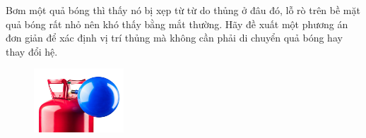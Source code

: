  Bơm một quả bóng thì thấy nó bị xẹp từ từ do thủng ở đâu đó, lỗ rò trên bề mặt quả bóng rất nhỏ nên khó thấy bằng mắt thường. Hãy đề xuất một phương án đơn giản để xác định vị trí thủng mà không cần phải di chuyển quả bóng hay thay đổi hệ.

 \begin{figure}[ht]
\centering
\includegraphics[width=0.3\textwidth,keepaspectratio]{Problem_5/Figs/P5.jpg}
\label{figP5}
\end{figure}